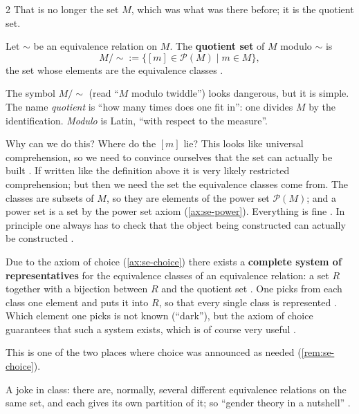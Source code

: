 \begin{paracol}{2}
That is no longer the set $M$, which was what was there before; it is the quotient set.

\begin{definition}\label{def:cl-quotient}
Let $\sim$ be an equivalence relation on $M$. The \textbf{quotient set} of $M$ modulo $\sim$ is
\[
  M/{\sim}:=\{[m]\in\mathcal P(M)\mid m\in M\},
\]
the set whose elements are the equivalence classes .
\end{definition}
The symbol $M/{\sim}$ (read ``$M$ modulo twiddle'') looks dangerous, but it is simple. The name \emph{quotient} is
``how many times does one fit in'': one divides $M$ by the identification. \emph{Modulo} is Latin, ``with respect to the
measure''.

Why can we do this? Where do the $[m]$ lie? This looks like universal comprehension, so we need to convince ourselves
that the set can actually be built . If written like the definition above it is very likely
restricted comprehension; but then we need the set the equivalence classes come from. The classes are subsets of $M$, so
they are elements of the power set $\mathcal P(M)$; and a power set is a set by the power set axiom
(\cref{ax:se-power}). Everything is fine . In principle one always has to check that the
object being constructed can actually be constructed .

\begin{remark}\label{rem:cl-representatives}
Due to the axiom of choice (\cref{ax:se-choice}) there exists a \textbf{complete system of representatives} for the
equivalence classes of an equivalence relation: a set $R$ together with a bijection between $R$ and the quotient set
. One picks from each class one element and puts it into
$R$, so that every single class is represented . Which element one picks is not known (``dark''), but the
axiom of choice guarantees that such a system exists, which is of course very useful .
\end{remark}
This is one of the two places where choice was announced as needed (\cref{rem:se-choice}).

\begin{aside}
A joke in class: there are, normally, several different equivalence relations on the same set, and each gives its own
partition of it; so ``gender theory in a nutshell'' .
\end{aside}


\end{paracol}
